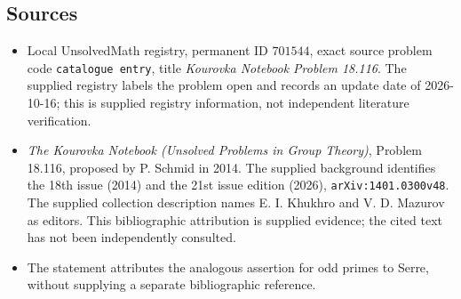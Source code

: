 \documentclass[11pt]{article}
\begin{document}
\subsection{Sources}
\begin{itemize}
\item Local UnsolvedMath registry, permanent ID $701544$, exact source problem code \texttt{catalogue entry}, title \emph{Kourovka Notebook Problem 18.116}. The supplied registry labels the problem open and records an update date of 2026-10-16; this is supplied registry information, not independent literature verification.
\item \emph{The Kourovka Notebook (Unsolved Problems in Group Theory)}, Problem 18.116, proposed by P. Schmid in 2014. The supplied background identifies the 18th issue (2014) and the 21st issue edition (2026), \texttt{arXiv:1401.0300v48}. The supplied collection description names E. I. Khukhro and V. D. Mazurov as editors. This bibliographic attribution is supplied evidence; the cited text has not been independently consulted.
\item The statement attributes the analogous assertion for odd primes to Serre, without supplying a separate bibliographic reference.
\end{itemize}
\end{document}
